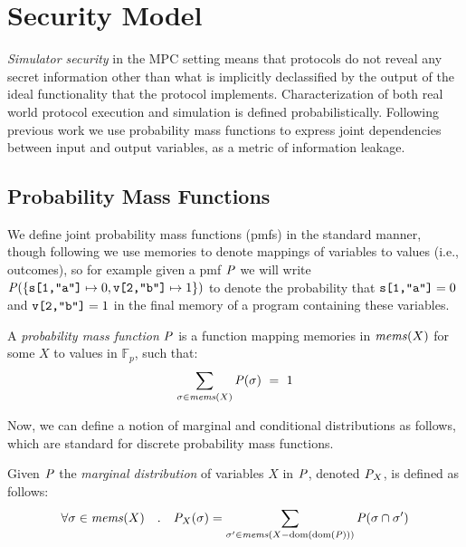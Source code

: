 \section{Security Model}
\label{section-pmf}

\emph{Simulator security} in the MPC setting means that protocols do
not reveal any secret information other than what is implicitly
declassified by the output of the ideal functionality that the
protocol implements. Characterization of both real world protocol
execution and simulation is defined probabilistically. Following
previous work \cite{barthe2019probabilistic} we use probability mass
functions to express joint dependencies between input and output
variables, as a metric of information leakage.

\subsection{Probability Mass Functions} 

We define joint probability mass functions (pmfs) in the standard
manner, though following \cite{barthe2019probabilistic} we use
memories to denote mappings of variables to values (i.e., outcomes),
so for example given a pmf $\mathit{P}$ we will write $\mathit{P}(\{ \texttt{s[1,"a"]}
\mapsto 0, \texttt{v[2,"b"]} \mapsto 1 \})$ to denote the probability that
$\texttt{s[1,"a"]} = 0$ and $\texttt{v[2,"b"]} = 1$ in the final memory of a
program containing these variables.
\begin{definition}
  A \emph{probability mass function} $\mathit{P}$ is a function
  mapping memories in $\mathit{mems}(X)$ for some $X$ to values in $\mathbb{F}_p$, such that:
  $$
  \sum_{\sigma \in \mathit{mems}(X)} \mathit{P}(\sigma) \  = \ 1
  $$
\end{definition}
Now, we can define a notion of marginal and conditional
distributions as follows, which are standard for discrete
probability mass functions. 
\begin{definition}
  Given $\mathit{P}$ the \emph{marginal distribution} of variables $X$
  in $\mathit{P}$, denoted ${\mathit{P}}_{X}$, is defined as follows:
  $$
  \forall \sigma \in \mathit{mems}(X) \quad . \quad {\mathit{P}}_{X}(\sigma) =
  \sum_{\sigma' \in \mathit{mems}(X-\mathrm{dom}(\mathrm{dom}(\mathit{P})))} \mathit{P}(\sigma \cap \sigma')
  $$
\end{definition}

